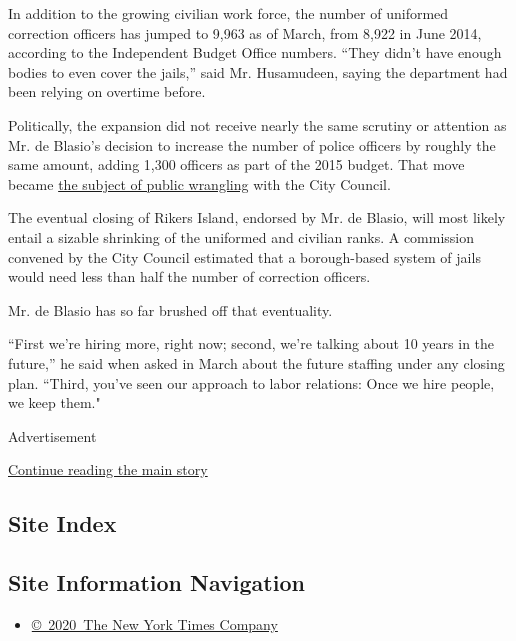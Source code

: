 In addition to the growing civilian work force, the number of uniformed
correction officers has jumped to 9,963 as of March, from 8,922 in June
2014, according to the Independent Budget Office numbers. ``They didn't
have enough bodies to even cover the jails,'' said Mr. Husamudeen,
saying the department had been relying on overtime before.

Politically, the expansion did not receive nearly the same scrutiny or
attention as Mr. de Blasio's decision to increase the number of police
officers by roughly the same amount, adding 1,300 officers as part of
the 2015 budget. That move became
\href{https://www.nytimes3xbfgragh.onion/2015/06/23/nyregion/mayor-de-blasio-poised-to-hire-hundreds-of-police-officers.html}{the
subject of public wrangling} with the City Council.

The eventual closing of Rikers Island, endorsed by Mr. de Blasio, will
most likely entail a sizable shrinking of the uniformed and civilian
ranks. A commission convened by the City Council estimated that a
borough-based system of jails would need less than half the number of
correction officers.

Mr. de Blasio has so far brushed off that eventuality.

``First we're hiring more, right now; second, we're talking about 10
years in the future,'' he said when asked in March about the future
staffing under any closing plan. ``Third, you've seen our approach to
labor relations: Once we hire people, we keep them."

Advertisement

\protect\hyperlink{after-bottom}{Continue reading the main story}

\hypertarget{site-index}{%
\subsection{Site Index}\label{site-index}}

\hypertarget{site-information-navigation}{%
\subsection{Site Information
Navigation}\label{site-information-navigation}}

\begin{itemize}
\tightlist
\item
  \href{https://help.nytimes3xbfgragh.onion/hc/en-us/articles/115014792127-Copyright-notice}{©~2020~The
  New York Times Company}
\end{itemize}


